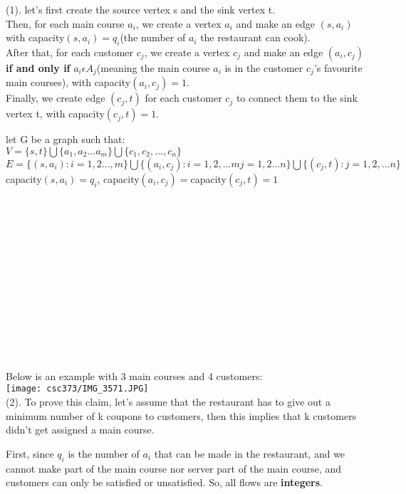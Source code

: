\documentclass{assignment-373}
\begin{document}
\begin{enumerate}
     (1). let's first create the source vertex s and the sink vertex t.\\  \phantom{=} \phantom{=} Then, for each main course $a_i$, we create a vertex $a_i$ and make an edge $(s,a_i)$ with capacity$(s,a_i)=q_i$(the number of $a_i$ the restaurant can cook).\\
     \phantom{=} \phantom{=} After that, for each customer $c_j$, we create a vertex $c_j$ and make an edge $(a_i,c_j)$ \textbf{if and only if} $a_i\epsilon A_j$(meaning the main course $a_i$ is in the customer $c_j$'s favourite main courses), with capacity$(a_i,c_j)=1$.\\
     \phantom{=} \phantom{=} Finally, we create edge $(c_j,t)$ for each customer $c_j$ to connect them to the sink vertex t, with capacity$(c_j,t)=1$.
     
      \phantom{=} \phantom{=} let G be a graph such that:\\
      \phantom{=} \phantom{=}  $V = \{s,t\}\bigcup\{a_1,a_2...a_m\}\bigcup\{c_1,c_2,...,c_n\}$\\
       \phantom{=} \phantom{=} $E = \{(s,a_i):i=1,2...,m\}\bigcup\{(a_i,c_j):i=1,2,...m j=1,2...n\}\bigcup\{(c_j,t):j=1,2,...n\}$\\
        \phantom{=} \phantom{=} capacity$(s,a_i)=q_i$, capacity$(a_i,c_j)=$capacity$(c_j,t)=1$
    \\
    \\
    \\
    \\
    \\
    \\
    \\
    \\
    \\
    \\
    \\
    \\
    \\
    \\
    Below is an example with 3 main courses and 4 customers:\\
    \texttt{[image: csc373/IMG\_3571.JPG]}\\
    
    (2). To prove this claim, let's assume that the restaurant has to give out a minimum number of k coupons to customers, then this implies that k customers didn't get assigned a main course.
    
    \phantom{=} \phantom{=} First, since $q_i$ is the number of $a_i$ that can be made in the restaurant, and we cannot make part of the main course nor server part of the main course, and customers can only be satisfied or unsatisfied. So, all flows are \textbf{integers}.
    

\end{enumerate}
\end{document}
